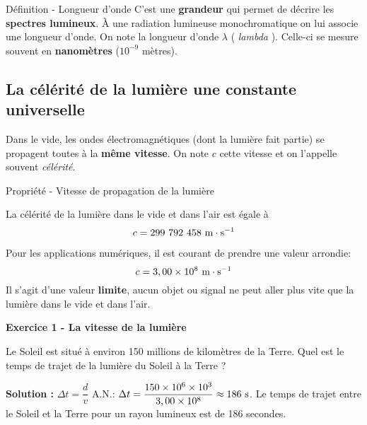 \documentclass[french, a4paper, 12pt]{article}
\newcommand{\exo}[3]{
	\begin{mdframed}[style=exo, leftmargin=0pt, rightmargin=0pt, innertopmargin=8pt, innerbottommargin=8pt, innerrightmargin=10pt, innerleftmargin=10pt]

		\noindent \textbf{Exercice #1 - #2}\medskip

		#3
	\end{mdframed}
}
\begin{document}




\begin{definition}{Définition - Longueur d'onde}
	C'est une \textbf{grandeur} qui permet de décrire les \textbf{spectres lumineux}. À une radiation lumineuse monochromatique on lui associe une longueur d'onde.  On note la longueur d'onde $\lambda$ (\og{} \textit{lambda} \fg{}). Celle-ci se mesure souvent en \textbf{nanomètres} ($10^{-9}$ mètres).
\end{definition}

\subsection{La célérité de la lumière une constante universelle}

Dans le vide, les ondes électromagnétiques (dont la lumière fait partie) se propagent toutes à la \textbf{même vitesse}. On note $c$ cette vitesse et on l'appelle souvent \textit{célérité}.

	\begin{Proposition}{Propriété - Vitesse de propagation de la lumière}
		
	La célérité de la lumière dans le vide et dans l'air est égale à 
	\[c=299~792~458~\rm m\cdot s^{-1}\]
	\end{Proposition}

Pour les applications numériques, il est courant de prendre une valeur arrondie: 
\[c = 3,00\times 10^8 ~\rm m\cdot s^{-1}\]Il s'agit d'une valeur \textbf{limite}, aucun objet ou signal ne peut aller plus vite que la lumière dans le vide et dans l'air.

\exo{1}{La vitesse de la lumière}{
	Le Soleil est situé à environ 150 millions de kilomètres de la Terre. Quel est le temps de trajet de la lumière du Soleil à la Terre ?\bigskip

	\textbf{Solution : } $\Delta t = \dfrac{d}{v}$ A.N.: $\Delta t = \dfrac{150\times 10^6\times 10^{3}}{3,00\times 10^8} \approx 186 ~\rm s$. Le temps de trajet entre le Soleil et la Terre pour un rayon lumineux est de 186 secondes. 
}
\end{document}
